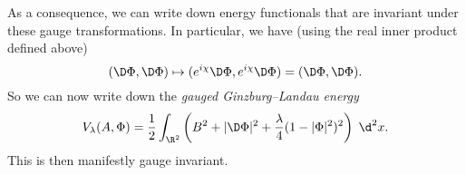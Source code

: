 \documentclass[a4paper]{article}
\begin{document}
As a consequence, we can write down energy functionals that are invariant under these gauge transformations. In particular, we have (using the real inner product defined above)
\[
  (\D \Phi, \D \Phi) \mapsto (e^{i\chi} \D \Phi, e^{i\chi} \D \Phi) = (\D \Phi, \D \Phi).
\]
So we can now write down the \emph{gauged Ginzburg--Landau energy}
\[
  V_\lambda(A, \Phi) = \frac{1}{2} \int_{\R^2} \left(B^2 + |\D \Phi|^2 + \frac{\lambda}{4} (1 - |\Phi|^2)^2\right)\;\d^2 x.
\]
This is then manifestly gauge invariant.
%
%
%
%
%
\end{document}
